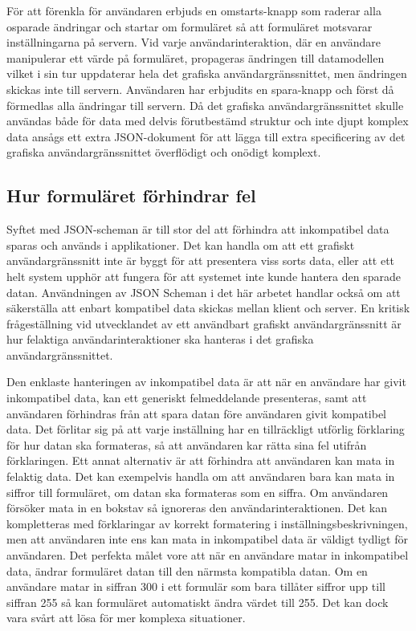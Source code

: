 För att förenkla för användaren erbjuds en omstarts-knapp som raderar alla osparade ändringar och startar om formuläret så att formuläret motsvarar inställningarna på servern. Vid varje användarinteraktion, där en användare manipulerar ett värde på formuläret, propageras ändringen till datamodellen vilket i sin tur uppdaterar hela det grafiska användargränssnittet, men ändringen skickas inte till servern. Användaren har erbjudits en spara-knapp och först då förmedlas alla ändringar till servern. Då det grafiska användargränssnittet skulle användas både för data med delvis förutbestämd struktur och inte djupt komplex data ansågs ett extra JSON-dokument för att lägga till extra specificering av det grafiska användargränssnittet överflödigt och onödigt komplext.


\subsection{Hur formuläret förhindrar fel}

Syftet med JSON-scheman är till stor del att förhindra att inkompatibel data sparas och används i applikationer. Det kan handla om att ett grafiskt användargränssnitt inte är byggt för att presentera viss sorts data, eller att ett helt system upphör att fungera för att systemet inte kunde hantera den sparade datan. Användningen av JSON Scheman i det här arbetet handlar också om att säkerställa att enbart kompatibel data skickas mellan klient och server. En kritisk frågeställning vid utvecklandet av ett användbart grafiskt användargränssnitt är hur felaktiga användarinteraktioner ska hanteras i det grafiska användargränssnittet.

\newpage

Den enklaste hanteringen av inkompatibel data är att när en användare har givit inkompatibel data, kan ett generiskt felmeddelande presenteras, samt att användaren förhindras från att spara datan före användaren givit kompatibel data. Det förlitar sig på att varje inställning har en tillräckligt utförlig förklaring för hur datan ska formateras, så att användaren kar rätta sina fel utifrån förklaringen. Ett annat alternativ är att förhindra att användaren kan mata in felaktig data. Det kan exempelvis handla om att användaren bara kan mata in siffror till formuläret, om datan ska formateras som en siffra. Om användaren försöker mata in en bokstav så ignoreras den användarinteraktionen. Det kan kompletteras med förklaringar av korrekt formatering i inställningsbeskrivningen, men att användaren inte ens kan mata in inkompatibel data är väldigt tydligt för användaren. Det perfekta målet vore att när en användare matar in inkompatibel data, ändrar formuläret datan till den närmsta kompatibla datan. Om en användare matar in siffran 300 i ett formulär som bara tillåter siffror upp till siffran 255 så kan formuläret automatiskt ändra värdet till 255. Det kan dock vara svårt att lösa för mer komplexa situationer.

